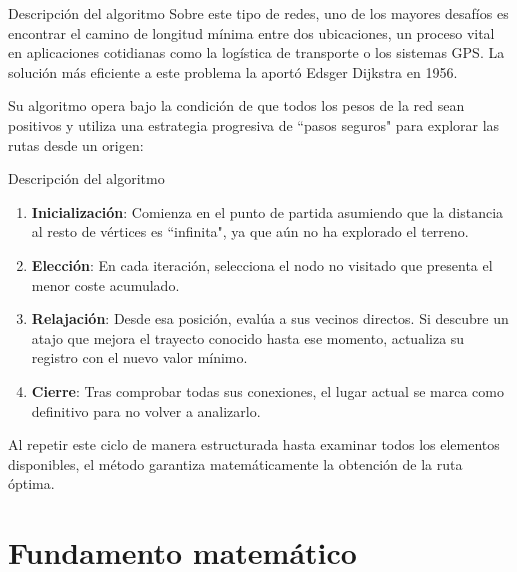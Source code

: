 \documentclass{beamer}
\begin{document}
    \begin{frame}{Descripción del algoritmo}
        Sobre este tipo de redes, uno de los mayores desafíos es encontrar el camino de
        longitud mínima entre dos ubicaciones, un proceso vital en aplicaciones cotidianas
        como la logística de transporte o los sistemas GPS. La solución más eficiente a este
        problema la aportó Edsger Dijkstra en 1956.

        \vspace{0.25cm}

        Su algoritmo opera bajo la condición de que todos los pesos de la red sean positivos y
        utiliza una estrategia progresiva de ``pasos seguros" para explorar las rutas desde un
        origen:
    \end{frame}

    \begin{frame}{Descripción del algoritmo}
        \begin{enumerate}
            \item \textbf{Inicialización}: Comienza en el punto de partida asumiendo que la distancia al
            resto de vértices es ``infinita", ya que aún no ha explorado el terreno.
            \item \textbf{Elección}: En cada iteración, selecciona el nodo no visitado que presenta el
            menor coste acumulado.
            \item \textbf{Relajación}: Desde esa posición, evalúa a sus vecinos directos. Si descubre un
            atajo que mejora el trayecto conocido hasta ese momento, actualiza su registro
            con el nuevo valor mínimo.
            \item \textbf{Cierre}: Tras comprobar todas sus conexiones, el lugar actual se marca como
            definitivo para no volver a analizarlo.
        \end{enumerate}

        Al repetir este ciclo de manera estructurada hasta examinar todos los elementos
        disponibles, el método garantiza matemáticamente la obtención de la ruta óptima.
    \end{frame}

    \section{Fundamento matemático}

\end{document}
